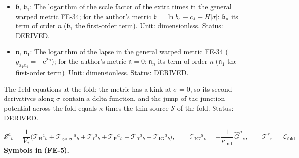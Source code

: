\documentclass[
  10pt,
]{article}
\begin{document}
\begin{itemize}
  first-order term). Unit: dimensionless. Status: DERIVED.
\item
  \(\mathfrak{b},\ \mathfrak{b}_1\): The logarithm of the scale factor
  of the extra times in the general warped metric FE-34; for the
  author's metric
  \(\mathfrak{b} = \ln b_4 - a_4 - H\lvert\sigma\rvert\);
  \(\mathfrak{b}_n\) its term of order \(n\) (\(\mathfrak{b}_1\) the
  first-order term). Unit: dimensionless. Status: DERIVED.
\item
  \(\mathfrak{n},\ \mathfrak{n}_1\): The logarithm of the lapse in the
  general warped metric FE-34
  (\(g_{x_4x_4} = -\mathrm{e}^{2\mathfrak{n}}\)); for the author's
  metric \(\mathfrak{n} = 0\); \(\mathfrak{n}_n\) its term of order
  \(n\) (\(\mathfrak{n}_1\) the first-order term). Unit: dimensionless.
  Status: DERIVED.
\end{itemize}

The field equations at the fold: the metric has a kink at
\(\sigma = 0\), so its second derivatives along \(\sigma\) contain a
delta function, and the jump of the junction potential across the fold
equals \(\kappa\) times the thin source \(\mathcal{S}\) of the fold.
Status: DERIVED.

\[
\mathcal{S}^a{}_b = \frac{1}{V_*}\Big(\mathcal{T}_{\mathrm{H}}{}^a{}_b + \mathcal{T}_{\mathrm{gauge}}{}^a{}_b + \mathcal{T}_{\mathrm{f}}{}^a{}_b
 + \mathcal{T}_{\mathrm{P}}{}^a{}_b + \mathcal{T}_{\mathrm{ff}}{}^a{}_b + \mathcal{T}_{\mathrm{IG}}{}^a{}_b\Big),\qquad
\mathcal{T}_{\mathrm{IG}}{}^\mu{}_\nu = -\frac{1}{\kappa_{\mathrm{ind}}}\,\hat G^\mu{}_\nu,\qquad
\mathcal{T}^r{}_r = \mathcal{L}_{\mathrm{fold}} \tag{FE-5}
\] \textbf{Symbols in (FE-5).}
\end{document}
